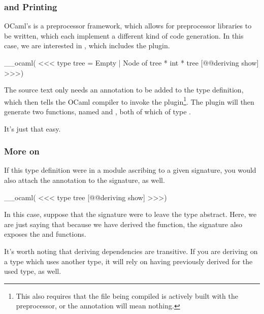 \documentclass[aspectratio=169, handout]{beamer}
\begin{document}
\begin{frame}[fragile]
  \frametitle{ and Printing}

  OCaml's  is a preprocessor framework, which allows for preprocessor
  libraries to be written, which each implement a different kind of code
  generation. In this case, we are interested in , which
  includes the  plugin.

  \vspace{\fill}

__ocaml(
<<<
  type tree =
    Empty
  | Node of tree * int * tree [@@deriving show]
>>>)

  \vspace{\fill}

  The source text only needs an  annotation to be
  added to the type definition, which then tells the OCaml compiler to invoke
  the plugin\footnote{This also requires that the file being compiled is actively
  built with the  preprocessor, or the annotation will
  mean nothing.}. The plugin will then generate two functions, named 
  and , both of which of type .

  \vspace{\fill}

  It's just that easy.
\end{frame}

\begin{frame}[fragile]
  \frametitle{More on }

  If this type definition were in a module ascribing to a given signature, you
  would also attach the  annotation to the signature,
  as well.

  \vspace{\fill}

__ocaml(
<<<
  type tree [@@deriving show]
>>>)

  \vspace{\fill}

  In this case, suppose that the signature were to leave the  type
  abstract. Here, we are just saying that because we have derived the 
  function, the signature also exposes the  and 
  functions.

  \vspace{\fill}

  It's worth noting that deriving dependencies are transitive. If you are deriving
   on a type which uses another type, it will rely on having previously
  derived  for the used type, as well.
\end{frame}
\end{document}
